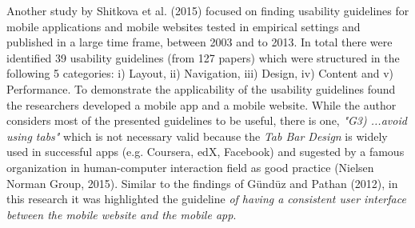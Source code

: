 \documentclass[version=last,fontsize=13pt]{scrartcl}
\begin{document}
	Another study by Shitkova et al. (2015) focused on finding usability guidelines for mobile applications and mobile websites tested in empirical settings and published in a large time frame, between 2003 and to 2013. In total there were identified 39 usability guidelines (from 127 papers) which were structured in the following 5 categories: i) Layout, ii) Navigation, iii) Design, iv) Content and v) Performance. To demonstrate the applicability of the usability guidelines found the researchers developed a mobile app and a mobile website. While the author considers most of the presented guidelines to be useful, there is one, \textit{"G3) ...avoid using tabs"} which is not necessary valid because the \textit{Tab Bar Design} is widely used in successful apps (e.g. Coursera, edX, Facebook) and sugested by a famous organization in human-computer interaction field as good practice (Nielsen Norman Group, 2015).  Similar to the findings of Gündüz and Pathan (2012), in this research it was highlighted the guideline \textit{of having a consistent user interface between the mobile website and the mobile app}.\\
\end{document}
